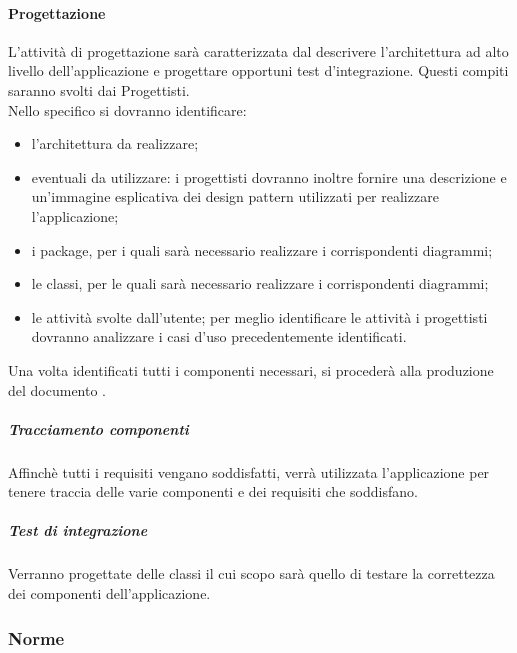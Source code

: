 		\paragraph{Progettazione}
		\label{sec:2.1.1.2}
			L'attività di progettazione sarà caratterizzata dal descrivere l'architettura ad alto livello dell'applicazione e progettare opportuni test d'integrazione. Questi compiti saranno svolti dai Progettisti. \\
			Nello specifico si dovranno identificare:
			\begin{itemize}
				\item l'architettura da realizzare;
				\item eventuali  da utilizzare: i progettisti dovranno inoltre fornire una descrizione e un'immagine esplicativa dei design pattern utilizzati per realizzare l'applicazione;
				\item i package, per i quali sarà necessario realizzare i corrispondenti diagrammi;
				\item le classi, per le quali sarà necessario realizzare i corrispondenti diagrammi;
				\item le attività svolte dall'utente; per meglio identificare le attività i progettisti dovranno analizzare i casi d'uso precedentemente identificati.
			\end{itemize}
			Una volta identificati tutti i componenti necessari, si procederà alla produzione del documento \STdoc.
			\subparagraph{Tracciamento componenti}
			\label{sec:2.1.1.2.3}
				Affinchè tutti i requisiti vengano soddisfatti, verrà utilizzata l'applicazione  per tenere traccia delle varie componenti e dei requisiti che soddisfano.
			\subparagraph{Test di integrazione}
			\label{sec:2.1.1.2.4}
				Verranno progettate delle classi il cui scopo sarà quello di testare la correttezza dei componenti dell'applicazione.
			
\subsubsection{Norme}
\label{sec:2.1.2}
